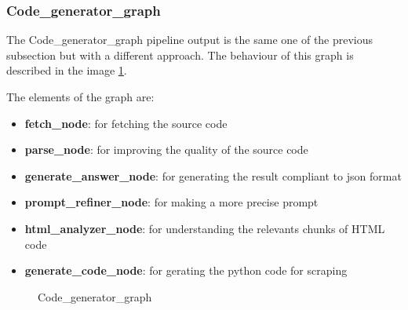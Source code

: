 \subsubsection{Code\_generator\_graph}

The Code\_generator\_graph pipeline output is the same one of the previous subsection but with a different approach. The behaviour of this graph is described in the image \ref{fig:code-generator}.

The elements of the graph are:
\begin{itemize}
    \item \textbf{fetch\_node}: for fetching the source code
    \item \textbf{parse\_node}: for improving the quality of the source code 
    \item \textbf{generate\_answer\_node}: for generating the result compliant to json format
    \item \textbf{prompt\_refiner\_node}: for making a more precise prompt
    \item \textbf{html\_analyzer\_node}: for understanding the relevants chunks of HTML code 
    \item \textbf{generate\_code\_node}: for gerating the python code for scraping
\end{itemize}

\begin{figure}[h!]
    \centering
    \caption{Code\_generator\_graph}
    \label{fig:code-generator}
\end{figure}



